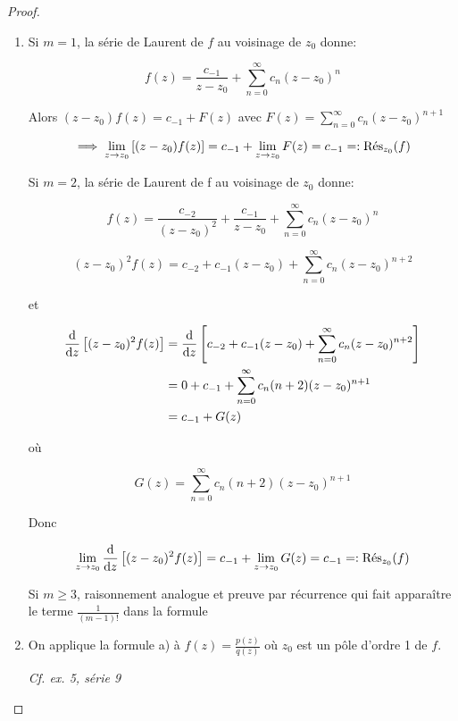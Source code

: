 \begin{proof}
    
    \begin{enumerate}[label=\alph*)]
    \item 
    Si $m = 1$, la série de Laurent de $f$ au voisinage de $z_0$ donne:
    
    \[ f(z) = \frac{c_{-1}}{z - z_0} + \sum_{n = 0}^\infty c_n (z - z_0)^n \]
    
    Alors $(z - z_0) f(z) = c_{-1} + F(z)$ avec $F(z) = \sum\limits_{n = 0}^\infty c_n (z - z_0)^{n + 1}$
    
    \[ \implies \lim_{z \rightarrow z_0} \left[ (z - z_0) f(z) \right] = c_{-1} + \lim_{z \rightarrow z_0} F(z) = c_{-1} =: \Res_{z_0}(f) \]
    
    Si $m = 2$, la série de Laurent de f au voisinage de $z_0$ donne:
    
    \[ f(z) = \frac{c_{-2}}{(z - z_0)^2} + \frac{c_{-1}}{z - z_0} + \sum_{n = 0}^\infty c_n (z - z_0)^n \]
    
    \[ (z - z_0)^2f(z) = c_{-2} + c_{-1}(z - z_0) + \sum_{n = 0}^\infty c_n (z - z_0)^{n + 2} \]
    
    et
    
    \begin{align*}
    \frac{\dd}{\dz}\left[ (z - z_0)^2 f(z) \right]
    &= \frac{\dd}{\dz}\left[ c_{-2} + c_{-1}(z - z_0) + \sum_{n = 0}^\infty c_n (z - z_0)^{n + 2} \right]
    \\&= 0 + c_{-1} + \sum_{n = 0}^\infty c_n (n + 2) (z - z_0)^{n + 1}
    \\&= c_{-1} + G(z)
    \end{align*}
    
    où
    
    \[ G(z) = \sum_{n = 0}^\infty c_n (n + 2) (z - z_0)^{n + 1} \]
    
    Donc
    
    \[
    \lim_{z \rightarrow z_0} \frac{\dd}{\dz}\left[ (z - z_0)^2 f(z) \right] = c_{-1} + \lim_{z \rightarrow z_0} G(z) = c_{-1} =: \Res_{z_0}(f)
    \]
    
    Si $m \geq 3$, raisonnement analogue et preuve par récurrence qui fait apparaître le terme $\frac{1}{(m - 1)!}$ dans la formule
    
    \item 
    On applique la formule a) à $f(z) = \frac{p(z)}{q(z)}$ où $z_0$ est un pôle d'ordre 1 de $f$.
    
    \textit{Cf. ex. 5, série 9}
    \end{enumerate}
\end{proof}
